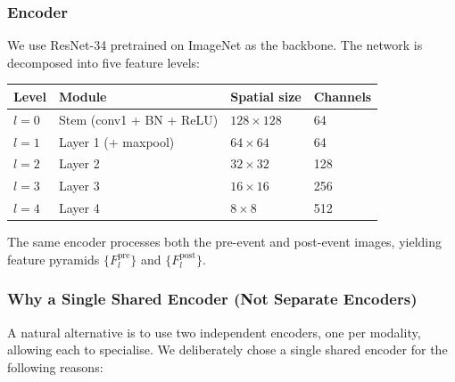 \documentclass[12pt,a4paper]{article}
\begin{document}
\subsubsection{Encoder}

We use ResNet-34 \citep{he2016resnet} pretrained on ImageNet as the backbone.  The
network is decomposed into five feature levels:

\begin{center}
\begin{tabular}{llll}
\toprule
Level & Module & Spatial size & Channels \\
\midrule
$l=0$ & Stem (conv1 + BN + ReLU) & $128\times128$ & 64 \\
$l=1$ & Layer 1 (+ maxpool)      & $64\times64$   & 64 \\
$l=2$ & Layer 2                  & $32\times32$   & 128 \\
$l=3$ & Layer 3                  & $16\times16$   & 256 \\
$l=4$ & Layer 4                  & $8\times8$     & 512 \\
\bottomrule
\end{tabular}
\end{center}

\noindent The same encoder processes both the pre-event and post-event images, yielding
feature pyramids $\{F^{\text{pre}}_l\}$ and $\{F^{\text{post}}_l\}$.

\subsubsection{Why a Single Shared Encoder (Not Separate Encoders)}

A natural alternative is to use two independent encoders, one per modality, allowing each
to specialise.  We deliberately chose a single shared encoder for the following reasons:
\end{document}
